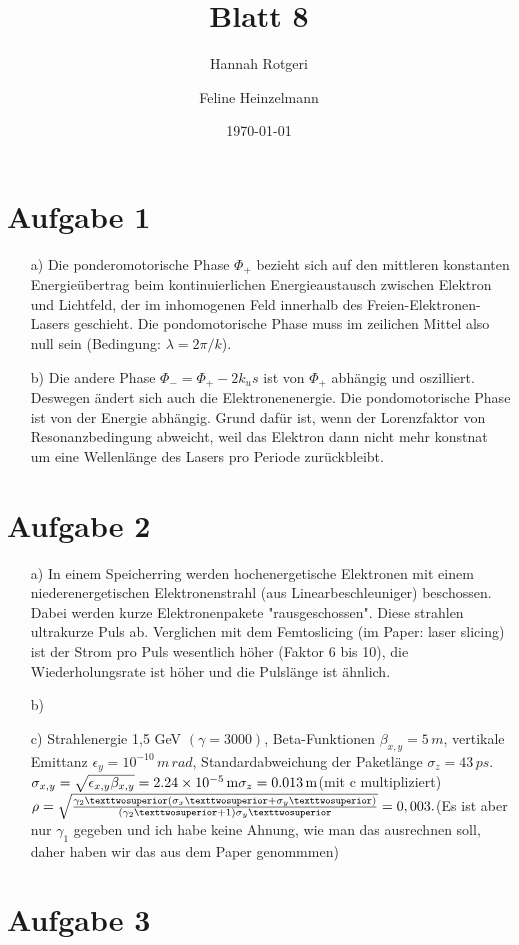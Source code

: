 \documentclass[11pt,a4paper]{article}
\title{Blatt 8}
\date{\today}
\author{Hannah Rotgeri \and Feline Heinzelmann}
\begin{document}
    \maketitle

    \section*{Aufgabe 1}
	\begin{itemize}
		\item[a)]
			Die ponderomotorische Phase $\Phi_{+}$ bezieht sich auf den mittleren konstanten Energieübertrag beim kontinuierlichen Energieaustausch zwischen Elektron und Lichtfeld, 
            der im inhomogenen Feld innerhalb des Freien-Elektronen-Lasers geschieht. 
            Die pondomotorische Phase muss im zeilichen Mittel also null sein (Bedingung: $\lambda = 2 \pi /k$). 
		\item[b)]
			Die andere Phase $\Phi_{-} = \Phi_{+} - 2k_{u}s$ ist von $\Phi_{+}$ abhängig und oszilliert. Deswegen ändert sich auch die Elektronenenergie.
            Die pondomotorische Phase ist von der Energie abhängig. Grund dafür ist, wenn der Lorenzfaktor von Resonanzbedingung abweicht, weil das Elektron dann nicht mehr konstnat um eine Wellenlänge des Lasers pro Periode zurückbleibt.
	\end{itemize}


	
    \section*{Aufgabe 2}
	\begin{itemize}
		\item[a)] 
			In einem Speicherring werden hochenergetische Elektronen mit einem niederenergetischen Elektronenstrahl (aus Linearbeschleuniger) beschossen.
			Dabei werden kurze Elektronenpakete "rausgeschossen".
			Diese strahlen ultrakurze Puls ab.
			Verglichen mit dem Femtoslicing (im Paper: laser slicing) ist der Strom pro Puls wesentlich höher (Faktor 6 bis 10),
			die Wiederholungsrate ist höher und die Pulslänge ist ähnlich.
			
		\item[b)]

		\item[c)]
			Strahlenergie 1,5 GeV $(\gamma  = 3000)$, Beta-Funktionen $\beta_{x,y}
			= 5\,m$, vertikale Emittanz $\epsilon_y = 10^{-10}\,m\,rad$, Standardabweichung der Paketlänge $\sigma_z = 43\,ps$. \\
			$\sigma_{x,y} = \sqrt{\epsilon_{x,y} \beta_ {x,y}} = \SI{2.24e-5}{\meter}\\
			\sigma_{z} = \SI{0.013}{\meter} $(mit c multipliziert)$\\
			\rho = \sqrt{\frac{\gamma_2 ² (\sigma_x² + \sigma_y²)}{(\gamma_2²+1)\sigma_y²}} = 0,003.\\
			$(Es ist aber nur $\gamma_{1}$ gegeben und ich habe keine Ahnung, wie man das ausrechnen soll, daher haben wir das aus dem Paper genommmen)
	\end{itemize}

	\section*{Aufgabe 3}
\end{document}
